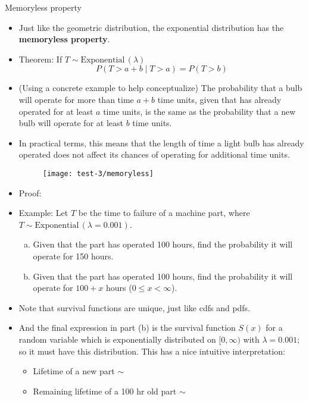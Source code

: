 \documentclass{article}
\newcommand{\follow}[1]{\sim \text{#1}\,}		%
\begin{document}
Memoryless property\bigskip
\begin{itemize}
    \item Just like the geometric distribution, the exponential distribution has the \textbf{memoryless property}.
    \item Theorem: If $T \follow{Exponential}(\lambda)$
    \[P(T > a + b \mid T > a) = P(T > b)\]
    \item (Using a concrete example to help conceptualize) The probability that a bulb will operate for more than time $a + b$ time units, given that has already operated for at least $a$ time units, is the same as the probability that a new bulb will operate for at least $b$ time units.
    \item[] In practical terms, this means that the length of time a light bulb has already operated does not affect its chances of operating for additional time units.
    \begin{figure}[H]
        \center\texttt{[image: test-3/memoryless]}
    \end{figure}
    \item Proof:\vspace{60pt}
    \item Example: Let $T$ be the time to failure of a machine part, where \\ $T \follow{Exponential}(\lambda = 0.001)$.
    \begin{enumerate}[(a)]
        \item Given that the part has operated 100 hours, find the probability it will operate for 150 hours.\vspace{40pt}
        \item Given that the part has operated 100 hours, find the probability it will operate for $100 + x$ hours ($0 \le x < \infty$).\vspace{40pt}
    \end{enumerate}
    \item Note that survival functions are unique, just like cdfs and pdfs.
    \item[] And the final expression in part (b) is the survival function $S(x)$ for a random variable which is exponentially distributed on $[0, \infty)$ with $\lambda = 0.001$; so it must have this distribution. This has a nice intuitive interpretation:
    \begin{itemize}
        \item Lifetime of a new part $\sim$
        \item Remaining lifetime of a 100 hr old part $\sim$
    \end{itemize}
\end{itemize}\bigskip
\end{document}
